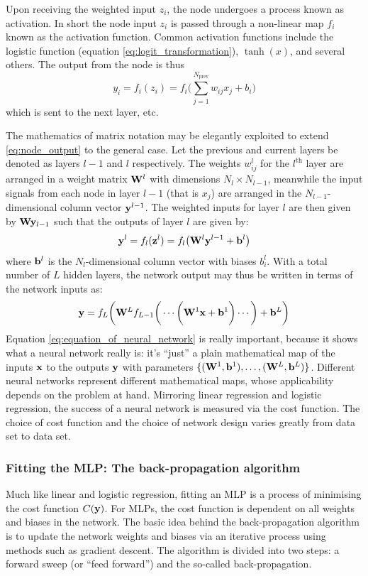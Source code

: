 \documentclass[nofootinbib,reprint,english]{revtex4-1}
\newcommand{\W}{\vb{W}}
\begin{document}
Upon receiving the weighted input \(z_i\), the node undergoes a process known as activation. In short the node input \(z_i\) is passed through a non-linear map \(f_i\) known as the activation function. Common activation functions include the logistic function (equation \eqref{eq:logit_transformation}), \(\tanh(x)\), and several others. The output from the node is thus
\begin{equation}\label{eq:node_output}
y_i=f_i(z_i)=f_i\Bigg(\sum_{j=1}^{N_\text{prev}}w_{ij}x_j+b_i\Bigg)
\end{equation}
which is sent to the next layer, etc.

The mathematics of matrix notation may be elegantly exploited to extend \eqref{eq:node_output} to the general case. Let the previous and current layers be denoted as layers \(l-1\) and \(l\) respectively. The weights \(w_{ij}^l\) for the \(l^\text{th}\) layer are arranged in a weight matrix \(\W^l\) with dimensions \(N_l\times N_{l-1}\), meanwhile the input signals from each node in layer \(l-1\) (that is \(x_j\)) are arranged in the \(N_{l-1}\)-dimensional column vector \(\vb{y}^{l-1}\). The weighted inputs for layer \(l\) are then given by \(\W\vb{y}_{l-1}\) such that the outputs of layer \(l\) are given by:
\begin{equation}\label{eq:node_output_matrix}
\vb{y}^l=f_l(\vb{z}^l)=f_l\big(\W^l\vb{y}^{l-1}+\vb{b}^l\big)
\end{equation}
where \(\vb{b}^l\) is the \(N_l\)-dimensional column vector with biases \(b_i^l\). With a total number of \(L\) hidden layers, the network output may thus be written in terms of the network inputs as:
\begin{equation}\label{eq:equation_of_neural_network}
\vb{y}=f_L\bigg(\W^Lf_{L-1}\bigg(\cdots \bigg(\W^1\vb{x}+\vb{b}^1\bigg)\cdots\bigg)+\vb{b}^L\bigg)
\end{equation}
Equation \eqref{eq:equation_of_neural_network} is really important, because it shows what a neural network really is: it's ``just'' a plain mathematical map of the inputs \(\vb{x}\) to the  outputs \(\vb{y}\) with parameters \(\{(\W^1,\vb{b}^1),\ldots,(\W^L,\vb{b}^L)\}\). Different neural networks represent different mathematical maps, whose applicability depends on the problem at hand. Mirroring linear regression and logistic regression, the success of a neural network is measured via the cost function. The choice of cost function and the choice of network design varies greatly from data set to data set. 
\subsubsection{Fitting the MLP: The back-propagation algorithm}
Much like linear and logistic regression, fitting an MLP is a process of minimising the cost function \(C(\vb{y})\). For MLPs, the cost function is dependent on all weights and biases in the network. The basic idea behind the back-propagation algorithm is to update the network weights and biases via an iterative process using methods such as gradient descent. The algorithm is divided into two steps: a forward sweep (or ``feed forward'') and the so-called back-propagation.
\end{document}
